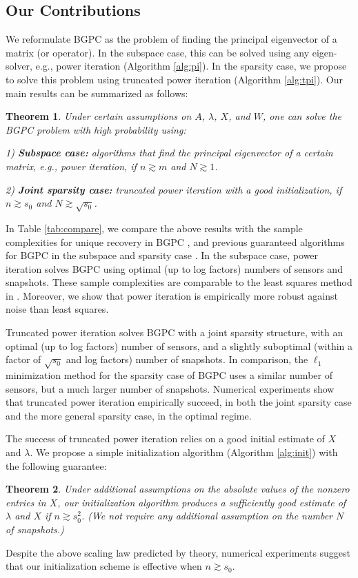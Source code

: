 \documentclass[11pt,journal]{IEEEtran}
\newtheorem{theorem}{Theorem}[section]
\begin{document}
\subsection{Our Contributions} \label{sec:contribution}

We reformulate BGPC as the problem of finding the principal eigenvector of a matrix (or operator). In the subspace case, this can be solved using any eigen-solver, e.g., power iteration (Algorithm \ref{alg:pi}). In the sparsity case, we propose to solve this problem using truncated power iteration (Algorithm \ref{alg:tpi}). Our main results can be summarized as follows:
\begin{theorem} \label{thm:summary}
Under certain assumptions on $A$, $\lambda$, $X$, and $W$, one can solve the BGPC problem with high probability using:

1) \textbf{Subspace case:} algorithms that find the principal eigenvector of a certain matrix, e.g., power iteration, if $n\gtrsim m$ and $N\gtrsim 1$.

2) \textbf{Joint sparsity case:} truncated power iteration with a good initialization, if $n\gtrsim s_0$ and $N\gtrsim \sqrt{s_0}$. 
\end{theorem}

In Table \ref{tab:compare}, we compare the above results with the sample complexities for unique recovery in BGPC \cite{Li2015e}, and previous guaranteed algorithms for BGPC in the subspace and sparsity case \cite{Ling2016,Wang2016}. In the subspace case, power iteration solves BGPC using optimal (up to log factors) numbers of sensors and snapshots. These sample complexities are comparable to the least squares method in \cite{Ling2016}. Moreover, we show that power iteration is empirically more robust against noise than least squares.

Truncated power iteration solves BGPC with a joint sparsity structure, with an optimal (up to log factors) number of sensors, and a slightly suboptimal (within a factor of $\sqrt{s_0}$ and log factors) number of snapshots. In comparison, the $\ell_1$ minimization method for the sparsity case of BGPC uses a similar number of sensors, but a much larger number of snapshots. Numerical experiments show that truncated power iteration empirically succeed, in both the joint sparsity case and the more general sparsity case, in the optimal regime.

The success of truncated power iteration relies on a good initial estimate of $X$ and $\lambda$. We propose a simple initialization algorithm (Algorithm \ref{alg:init}) with the following guarantee:
\begin{theorem} \label{thm:summary_init}
Under additional assumptions on the absolute values of the nonzero entries in $X$, our initialization algorithm produces a sufficiently good estimate of $\lambda$ and $X$ if $n\gtrsim s_0^2$. (We not require any additional assumption on the number $N$ of snapshots.)
\end{theorem}
Despite the above scaling law predicted by theory, numerical experiments suggest that our initialization scheme is effective when $n\gtrsim s_0$.
\end{document}

